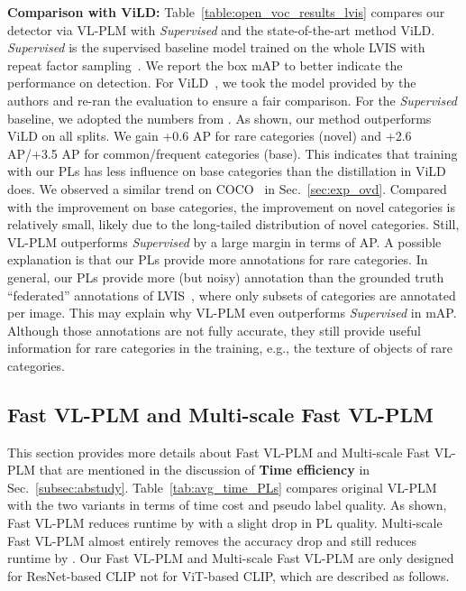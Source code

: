 \documentclass[runningheads]{llncs}
\begin{document}
\vspace{1mm}
\noindent \textbf{Comparison with ViLD:} 
Table~\ref{table:open_voc_results_lvis} compares our detector via VL-PLM with \emph{Supervised} and the state-of-the-art method ViLD. \emph{Supervised} is the supervised baseline model trained on the whole LVIS with repeat factor sampling~\cite{gupta2019lvis,mahajan2018eccv_rfs}.
We report the box mAP to better indicate the performance on detection.
For ViLD~\cite{gu_iclr_22}, we took the model provided by the authors and re-ran the evaluation to ensure a fair comparison. For the \emph{Supervised} baseline, we adopted the numbers from \cite{gu_iclr_22}.
As shown, our method outperforms ViLD on all splits. We gain +0.6 AP for rare categories (novel) and +2.6 AP/+3.5 AP for common/frequent categories (base). This indicates that training with our PLs has less influence on base categories than the distillation in ViLD does. We observed a similar trend on COCO~\cite{COCO} in Sec.~\ref{sec:exp_ovd}.
Compared with the improvement on base categories, the improvement on novel categories is relatively small, likely due to the long-tailed distribution of novel categories.
Still, VL-PLM outperforms \emph{Supervised} by a large margin in terms of AP.
A possible explanation is that our PLs provide more annotations for rare categories.
In general, our PLs provide more (but noisy) annotation than the grounded truth ``federated'' annotations of LVIS~\cite{gupta2019lvis}, where only subsets of categories are annotated per image. This may explain why VL-PLM even outperforms \emph{Supervised} in mAP.
Although those annotations are not fully accurate, they still provide useful information for rare categories in the training, e.g., the texture of objects of rare categories.



\subsection{Fast VL-PLM and Multi-scale Fast VL-PLM} \label{subsec:fast_vl_plm}

This section provides more details about Fast VL-PLM and Multi-scale Fast VL-PLM that are mentioned in the discussion of {\bf Time efficiency} in Sec.~\ref{subsec:abstudy}.
Table~\ref{tab:avg_time_PLs} compares original VL-PLM with the two variants in terms of time cost and pseudo label quality. 
As shown, Fast VL-PLM reduces runtime by  with a slight drop in PL quality. Multi-scale Fast VL-PLM almost entirely removes the accuracy drop and still reduces runtime by .
Our Fast VL-PLM and Multi-scale Fast VL-PLM are only designed for ResNet-based CLIP not for ViT-based CLIP, which are described as follows.
\end{document}
